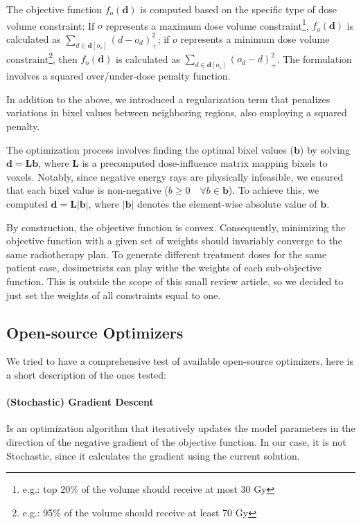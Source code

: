 \documentclass[a4paper]{article}
\newcommand{\abs}[1]{|{#1}|}
\begin{document}
	The objective function \(f_o(\mathbf{d})\) is computed based on the specific type of dose volume constraint:
	If \(o\) represents a maximum dose volume constraint\footnote{e.g.: top 20\% of the volume should receive at most 30 Gy}, \(f_o(\mathbf{d})\) is calculated as \(\sum_{d \in \mathbf{d}[o_s]}(d - o_d)_+^2\); if \(o\) represents a minimum dose volume constraint\footnote{e.g.: 95\% of the volume should receive at least 70 Gy}, then \(f_o(\mathbf{d})\) is calculated as \(\sum_{d \in \mathbf{d}[o_s]}(o_d - d)_+^2\).
	The formulation involves a squared over/under-dose penalty function.
	
	In addition to the above, we introduced a regularization term that penalizes variations in bixel values between neighboring regions, also employing a squared penalty.
	
	The optimization process involves finding the optimal bixel values (\(\mathbf{b}\)) by solving \(\mathbf{d} = \mathbf{L}\mathbf{b}\), where \(\mathbf{L}\) is a precomputed dose-influence matrix mapping bixels to voxels.
	Notably, since negative energy rays are physically infeasible, we ensured that each bixel value is non-negative (\(b \geq 0 \quad \forall b \in \mathbf{b}\)).
	To achieve this, we computed \(\mathbf{d} = \mathbf{L}\abs{\mathbf{b}}\), where \(\abs{\mathbf{b}}\) denotes the element-wise absolute value of \(\mathbf{b}\).
	
	By construction, the objective function is convex.
	Consequently, minimizing the objective function with a given set of weights should invariably converge to the same radiotherapy plan.
	To generate different treatment doses for the same patient case, dosimetrists can play withe the weights of each sub-objective function.
	This is outside the scope of this small review article, so we decided to just set the weights of all constraints equal to one.
	
	\subsection{Open-source Optimizers}
	We tried to have a comprehensive test of available open-source optimizers, here is a short description of the ones tested:
	
	\paragraph{(Stochastic) Gradient Descent}
	Is an optimization algorithm that iteratively updates the model parameters in the direction of the negative gradient of the objective function.
	In our case, it is not Stochastic, since it calculates the gradient using the current solution.
\end{document}
